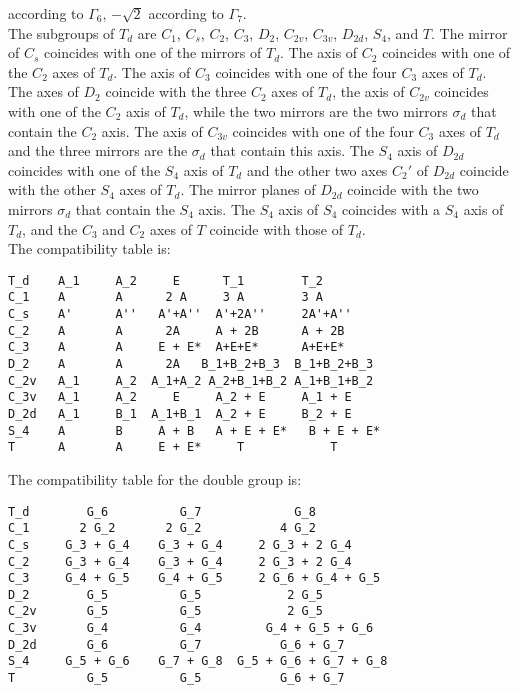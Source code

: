\documentclass[12pt,a4paper]{article}
\begin{document}
according to $\Gamma_6$, $-\sqrt{2}$ according to $\Gamma_7$. \\
The subgroups of $T_d$ are $C_1$, $C_s$, $C_2$, $C_3$, $D_2$, $C_{2v}$,
$C_{3v}$, $D_{2d}$, $S_4$, and $T$. The mirror of $C_s$ coincides with one
of the mirrors of $T_d$. The axis of $C_2$ coincides with one of the $C_2$
axes of $T_d$. The axis of $C_3$ coincides with one of the four $C_3$
axes of $T_d$. The axes of $D_2$ coincide with the three $C_2$ axes of
$T_d$, the axis of $C_{2v}$ coincides with one of the $C_2$ axis of 
$T_d$, while the two mirrors are the two mirrors $\sigma_d$ that contain
the $C_2$ axis. The axis of $C_{3v}$ coincides with one of the four
$C_3$ axes of $T_d$ and the three mirrors are the $\sigma_d$ that 
contain this axis. The $S_4$ axis of $D_{2d}$ coincides with one of
the $S_4$ axis of $T_d$ and the other two axes $C_2'$ of $D_{2d}$ coincide with the 
other $S_4$ axes of $T_d$. The mirror planes of $D_{2d}$ coincide with the two
mirrors $\sigma_d$ that contain the $S_4$ axis. The $S_4$ axis of $S_4$ 
coincides with a $S_4$ axis of $T_d$, and the $C_3$ and $C_2$ axes of $T$ 
coincide with those of $T_d$. \\
The compatibility table is:
\begin{verbatim}
T_d    A_1     A_2     E      T_1        T_2
C_1    A       A      2 A     3 A        3 A
C_s    A'      A''   A'+A''  A'+2A''     2A'+A''
C_2    A       A      2A     A + 2B      A + 2B
C_3    A       A     E + E*  A+E+E*      A+E+E*
D_2    A       A      2A   B_1+B_2+B_3  B_1+B_2+B_3
C_2v   A_1     A_2  A_1+A_2 A_2+B_1+B_2 A_1+B_1+B_2
C_3v   A_1     A_2     E     A_2 + E     A_1 + E   
D_2d   A_1     B_1  A_1+B_1  A_2 + E     B_2 + E
S_4    A       B     A + B   A + E + E*   B + E + E*  
T      A       A     E + E*     T            T
\end{verbatim}
The compatibility table for the double group is:
\begin{verbatim}
T_d        G_6          G_7             G_8
C_1       2 G_2       2 G_2           4 G_2
C_s     G_3 + G_4    G_3 + G_4     2 G_3 + 2 G_4
C_2     G_3 + G_4    G_3 + G_4     2 G_3 + 2 G_4
C_3     G_4 + G_5    G_4 + G_5     2 G_6 + G_4 + G_5
D_2        G_5          G_5            2 G_5
C_2v       G_5          G_5            2 G_5
C_3v       G_4          G_4         G_4 + G_5 + G_6
D_2d       G_6          G_7           G_6 + G_7
S_4     G_5 + G_6    G_7 + G_8  G_5 + G_6 + G_7 + G_8  
T          G_5          G_5           G_6 + G_7
\end{verbatim}
\end{document}
